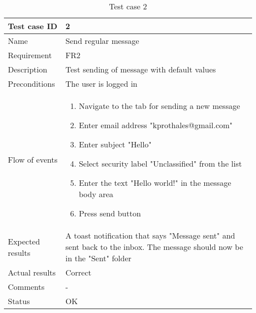 		\begin{table}[htb]
			\begin{tabular}{l|p{10cm}}
				Test case ID & 2 \\ \hline
				Name & Send regular message\\ \hline
				Requirement & FR2\\ \hline
				Description & Test sending of message with default values\\ \hline
				Preconditions & The user is logged in\\ \hline
				Flow of events & 
					\begin{enumerate}
						\item{}Navigate to the tab for sending a new message
						\item{}Enter email address "kprothales@gmail.com"
						\item{}Enter subject "Hello"
						\item{}Select security label "Unclassified" from the list
						\item{}Enter the text "Hello world!" in the message body area
						\item{}Press send button
					\end{enumerate} \\ \hline
				Expected results & A toast notification that says "Message sent" and sent back to the inbox. The message 						should now be in the "Sent" folder\\ \hline
				Actual results & Correct\\ \hline
				Comments & -\\ \hline
				Status & OK\\ \hline
			\end{tabular}
			\caption{Test case 2} \label{tab:case2}
		\end{table}

